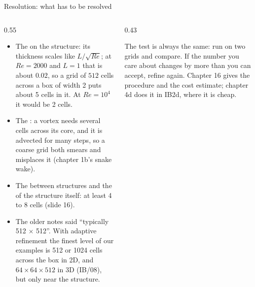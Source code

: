 \documentclass[aspectratio=169,11pt]{beamer}
\begin{document}
\begin{frame}{Resolution: what has to be resolved}
\begin{columns}[T,onlytextwidth]
\begin{column}{0.55\textwidth}
\footnotesize
\begin{itemize}
  \item The  on the structure: its thickness scales like $L/\sqrt{Re}$; at $Re = 2000$ and $L = 1$ that is about $0.02$, so a grid of $512$ cells across a box of width 2 puts about 5 cells in it. At $Re = 10^4$ it would be 2 cells.
  \item The : a vortex needs several cells across its core, and it is advected for many steps, so a coarse grid both smears and misplaces it (chapter 1b's snake wake).
  \item The  between structures and the  of the structure itself: at least 4 to 8 cells (slide 16).
  \item The older notes said ``typically 512 $\times$ 512''. With adaptive refinement the finest level of our examples is 512 or 1024 cells across the box in 2D, and $64\times64\times512$ in 3D (IB/08), but only near the structure.
\end{itemize}
\end{column}
\begin{column}{0.43\textwidth}
\begin{punchbox}
\small The test is always the same: run on two grids and compare. If the number you care about changes by more than you can accept, refine again. Chapter 16 gives the procedure and the cost estimate; chapter 4d does it in IB2d, where it is cheap.
\end{punchbox}
\end{column}
\end{columns}
\end{frame}
\end{document}
